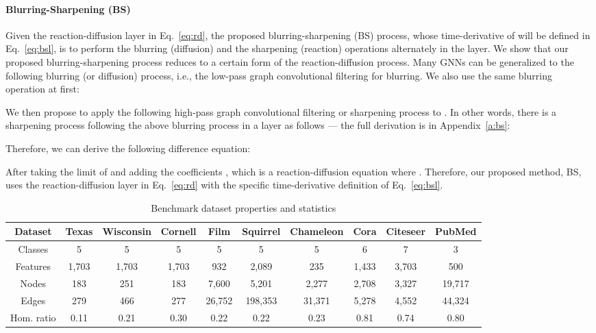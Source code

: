 \documentclass{article}
\theoremstyle{plain}
\theoremstyle{definition}
\theoremstyle{remark}
\begin{document}
\paragraph{Blurring-Sharpening (BS)} Given the reaction-diffusion layer in Eq.~\eqref{eq:rd}, the proposed blurring-sharpening (BS) process, whose time-derivative of  will be defined in Eq.~\eqref{eq:bsl}, is to perform the blurring (diffusion) and the sharpening (reaction) operations alternately in the layer. 
We show that our proposed blurring-sharpening process reduces to a certain form of the reaction-diffusion process. Many GNNs can be generalized to the following blurring (or diffusion) process, i.e., the low-pass graph convolutional filtering for blurring. We also use the same blurring operation at first:


We then propose to apply the following high-pass graph convolutional filtering or sharpening process to . In other words, there is a sharpening process following the above blurring process in a layer as follows --- the full derivation is in Appendix~\ref{a:bs}:


Therefore, we can derive the following difference equation:


After taking the limit of  and adding the coefficients ,
which is a reaction-diffusion equation where . Therefore, our proposed method, BS, uses the reaction-diffusion layer in Eq.~\eqref{eq:rd} with the specific time-derivative definition of Eq.~\eqref{eq:bsl}.



\begin{table*}[ht!]
    \small
    \centering
    \setlength{\tabcolsep}{2pt}
    \caption{Benchmark dataset properties and statistics}
    \begin{tabular}{c ccccccccc}\toprule
        Dataset         & Texas & Wisconsin & Cornell & Film   & Squirrel & Chameleon & Cora  & Citeseer & PubMed \\ \midrule
        Classes         & 5     & 5         & 5       & 5      & 5        & 5         & 6     & 7        & 3      \\
        Features        & 1,703 & 1,703     & 1,703   & 932    & 2,089    & 235       & 1,433 & 3,703    & 500    \\
        Nodes           & 183   & 251       & 183     & 7,600  & 5,201    & 2,277     & 2,708 & 3,327    & 19,717 \\
        Edges           & 279   & 466       & 277     & 26,752 & 198,353  & 31,371    & 5,278 & 4,552    & 44,324 \\
        Hom. ratio      & 0.11  & 0.21      & 0.30    & 0.22   & 0.22     & 0.23      & 0.81  & 0.74     & 0.80  \\
        \bottomrule
    \end{tabular}
    \label{tab:data}
\end{table*}
\end{document}

